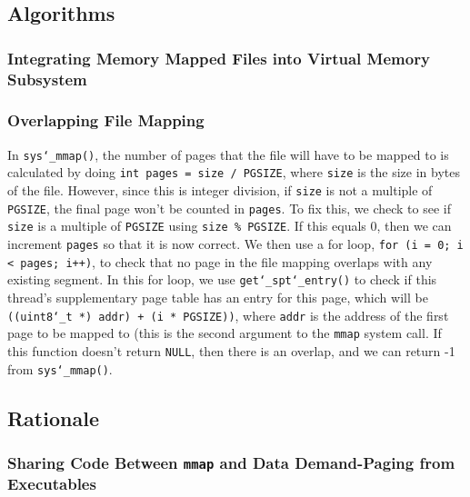 \documentclass{article}
\renewcommand{\_}{\char`_}
\begin{document}
\subsection{Algorithms}

\subsubsection{Integrating Memory Mapped Files into Virtual Memory Subsystem}



\subsubsection{Overlapping File Mapping}

In \texttt{sys\_mmap()}, the number of pages that the file will have to be mapped to is calculated by doing \texttt{int pages = size / PGSIZE}, where \texttt{size} is the size in bytes of the file. However, since this is integer division, if \texttt{size} is not a multiple of \texttt{PGSIZE}, the final page won't be counted in \texttt{pages}. To fix this, we check to see if \texttt{size} is a multiple of \texttt{PGSIZE} using \texttt{size \% PGSIZE}. If this equals 0, then we can increment \texttt{pages} so that it is now correct. We then use a for loop, \texttt{for (i = 0; i < pages; i++)}, to check that no page in the file mapping overlaps with any existing segment. In this for loop, we use \texttt{get\_spt\_entry()} to check if this thread's supplementary page table has an entry for this page, which will be \texttt{((uint8\_t *) addr) + (i * PGSIZE))}, where \texttt{addr} is the address of the first page to be mapped to (this is the second argument to the \texttt{mmap} system call. If this function doesn't return \texttt{NULL}, then there is an overlap, and we can return -1 from \texttt{sys\_mmap()}.

\subsection{Rationale}

\subsubsection{Sharing Code Between \texttt{mmap} and Data Demand-Paging from Executables}
\end{document}
